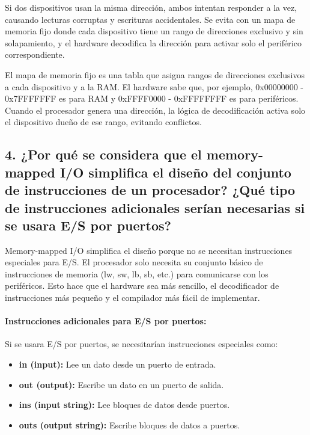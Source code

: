 \documentclass[12pt]{article}
\begin{document}
Si dos dispositivos usan la misma dirección, ambos intentan responder a la vez, causando lecturas corruptas y escrituras accidentales. Se evita con un mapa de memoria fijo donde cada dispositivo tiene un rango de direcciones exclusivo y sin solapamiento, y el hardware decodifica la dirección para activar solo el periférico correspondiente.

El mapa de memoria fijo es una tabla que asigna rangos de direcciones exclusivos a cada dispositivo y a la RAM. El hardware sabe que, por ejemplo, 0x00000000 - 0x7FFFFFFF es para RAM y 0xFFFF0000 - 0xFFFFFFFF es para periféricos. Cuando el procesador genera una dirección, la lógica de decodificación activa solo el dispositivo dueño de ese rango, evitando conflictos.

\subsection*{4. ¿Por qué se considera que el memory-mapped I/O simplifica el diseño del conjunto de instrucciones de un procesador? ¿Qué tipo de instrucciones adicionales serían necesarias si se usara E/S por puertos?}

Memory-mapped I/O simplifica el diseño porque no se necesitan instrucciones especiales para E/S. El procesador solo necesita su conjunto básico de instrucciones de memoria (lw, sw, lb, sb, etc.) para comunicarse con los periféricos. Esto hace que el hardware sea más sencillo, el decodificador de instrucciones más pequeño y el compilador más fácil de implementar.

\paragraph*{Instrucciones adicionales para E/S por puertos:}

Si se usara E/S por puertos, se necesitarían instrucciones especiales como:

\begin{itemize}
    \item \textbf{in (input):} Lee un dato desde un puerto de entrada.
    \item \textbf{out (output):} Escribe un dato en un puerto de salida.
    \item \textbf{ins (input string):} Lee bloques de datos desde puertos.
    \item \textbf{outs (output string):} Escribe bloques de datos a puertos.
\end{itemize}
\end{document}
